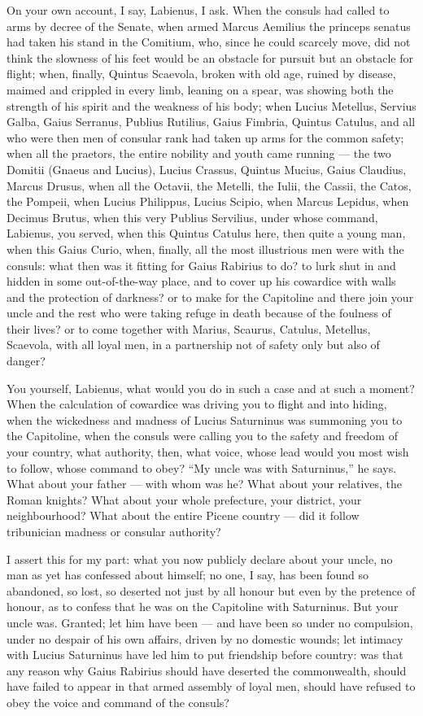  On your own account, I say, Labienus, I ask. When the consuls had called to arms by decree of the Senate, when armed Marcus Aemilius the princeps senatus had taken his stand in the Comitium, who, since he could scarcely move, did not think the slowness of his feet would be an obstacle for pursuit but an obstacle for flight; when, finally, Quintus Scaevola, broken with old age, ruined by disease, maimed and crippled in every limb, leaning on a spear, was showing both the strength of his spirit and the weakness of his body; when Lucius Metellus, Servius Galba, Gaius Serranus, Publius Rutilius, Gaius Fimbria, Quintus Catulus, and all who were then men of consular rank had taken up arms for the common safety; when all the praetors, the entire nobility and youth came running --- the two Domitii (Gnaeus and Lucius), Lucius Crassus, Quintus Mucius, Gaius Claudius, Marcus Drusus, when all the Octavii, the Metelli, the Iulii, the Cassii, the Catos, the Pompeii, when Lucius Philippus, Lucius Scipio, when Marcus Lepidus, when Decimus Brutus, when this very Publius Servilius, under whose command, Labienus, you served, when this Quintus Catulus here, then quite a young man, when this Gaius Curio, when, finally, all the most illustrious men were with the consuls: what then was it fitting for Gaius Rabirius to do? to lurk shut in and hidden in some out-of-the-way place, and to cover up his cowardice with walls and the protection of darkness? or to make for the Capitoline and there join your uncle and the rest who were taking refuge in death because of the foulness of their lives? or to come together with Marius, Scaurus, Catulus, Metellus, Scaevola, with all loyal men, in a partnership not of safety only but also of danger?

 You yourself, Labienus, what would you do in such a case and at such a moment? When the calculation of cowardice was driving you to flight and into hiding, when the wickedness and madness of Lucius Saturninus was summoning you to the Capitoline, when the consuls were calling you to the safety and freedom of your country, what authority, then, what voice, whose lead would you most wish to follow, whose command to obey? ``My uncle was with Saturninus,'' he says. What about your father --- with whom was he? What about your relatives, the Roman knights? What about your whole prefecture, your district, your neighbourhood? What about the entire Picene country --- did it follow tribunician madness or consular authority?

 I assert this for my part: what you now publicly declare about your uncle, no man as yet has confessed about himself; no one, I say, has been found so abandoned, so lost, so deserted not just by all honour but even by the pretence of honour, as to confess that he was on the Capitoline with Saturninus. But your uncle was. Granted; let him have been --- and have been so under no compulsion, under no despair of his own affairs, driven by no domestic wounds; let intimacy with Lucius Saturninus have led him to put friendship before country: was that any reason why Gaius Rabirius should have deserted the commonwealth, should have failed to appear in that armed assembly of loyal men, should have refused to obey the voice and command of the consuls?

